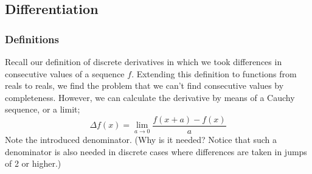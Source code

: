 \documentclass{article}
\theoremstyle{definition}
\begin{document}
\subsection{Differentiation}
\subsubsection{Definitions}
Recall our definition of discrete derivatives in which we took differences in consecutive values of a sequence $f$. Extending this definition to functions from reals to reals, we find the problem that we can't find consecutive values by completeness. However, we can calculate the derivative by means of a Cauchy sequence, or a limit;
\[\Delta f(x)=\lim\limits_{a\rightarrow0}\frac{f(x+a)-f(x)}{a}\]
Note the introduced denominator. (Why is it needed? Notice that such a denominator is also needed in discrete cases where differences are taken in jumps of 2 or higher.)\par
\end{document}
